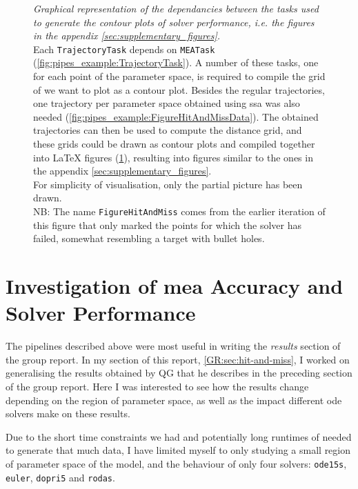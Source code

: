 \begin{figure}
\begin{subfigure}[t]{\textwidth}
        \label{fig:pipes_example:FigureHitAndMissTex}
    \end{subfigure}
    \caption{\emph{Graphical representation of the dependancies between the tasks used to generate the contour plots of solver performance, i.e. the figures in the appendix \autoref{sec:supplementary_figures}.}\\ 
    Each  \texttt{TrajectoryTask} depends on \texttt{MEATask} (\ref{fig:pipes_example:TrajectoryTask}).
    A number of these tasks, one for each point of the parameter space, is required to compile the grid of we want to plot as a contour plot.
    Besides the regular trajectories, one trajectory per parameter space obtained using \acrlong{ssa} was also needed (\ref{fig:pipes_example:FigureHitAndMissData}).
    The obtained trajectories can then be used to compute the distance grid, and these grids could be drawn as contour plots and compiled together into \LaTeX{} figures (\ref{fig:pipes_example:FigureHitAndMissTex}), resulting into figures similar to the ones in the appendix \autoref{sec:supplementary_figures}.\\
    For simplicity of visualisation, only the partial picture has been drawn.\\
    NB: The name {\tt FigureHitAndMiss} comes from the earlier iteration of this figure that only marked the points for which the solver has failed, somewhat resembling a target with bullet holes.}
    \label{fig:pipes_example}
\end{figure}

\section{Investigation of \acrshort{mea} Accuracy and Solver Performance}

The pipelines described above were most useful in writing the \emph{results} section of the group report. In my section of this report, \autoref{GR:sec:hit-and-miss}, I worked on generalising the results obtained by QG that he describes in the preceding section of the group report. 
Here I was interested to see how the results change depending on the region of parameter space, as well as the impact different \gls{ode} solvers make on these results.

Due to the short time constraints we had and potentially long runtimes of needed to generate that much data, I have limited myself to only studying a small region of parameter space of the \pft{} model, and the behaviour of only four solvers: \texttt{ode15s}, \texttt{euler}, \texttt{dopri5} and \texttt{rodas}.

